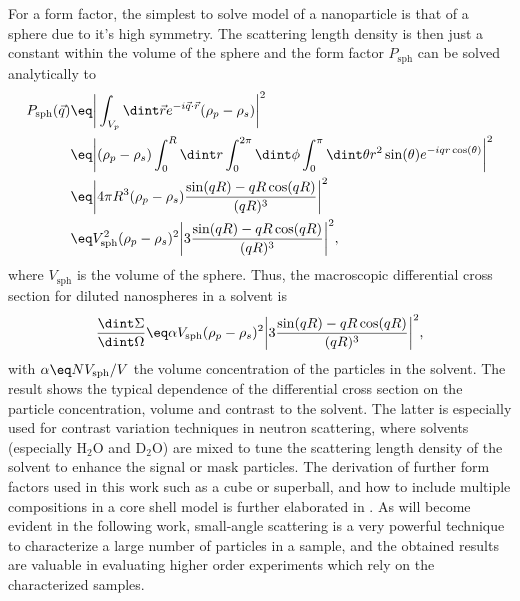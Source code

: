 \documentclass[\main/dresen_thesis.tex]{subfiles}
\begin{document}
    For a form factor, the simplest to solve model of a nanoparticle is that of a sphere due to it's high symmetry.
    The scattering length density is then just a constant within the volume of the sphere and the form factor $P_\mathrm{sph}$ can be solved analytically to
    \begin{align}
      \begin{split}
        P_\mathrm{sph} (\vec{q})
        \eq & \bigg|\int_{V_{p}} \dint \vec{r} e^{-i\vec{q} \cdot \vec{r}} (\rho_p - \rho_s) \bigg|^2 \\
        \eq & \bigg|(\rho_p - \rho_s) \int_0^R \dint r \int_0^{2 \pi} \dint \phi \int_0^\pi \dint \theta r^2 \sin(\theta) e^{-i q r \cos(\theta)}  \bigg|^2 \\
        \eq &  \bigg| 4\pi R^3 (\rho_p - \rho_s) \frac{\sin(qR) - qR\cos(qR)}{(qR)^3}  \bigg|^2\\
        \eq & V_\mathrm{sph}^2 (\rho_p - \rho_s)^2 \bigg|3 \frac{\sin(qR) - qR\cos(qR)}{(qR)^3}  \bigg|^2,
      \end{split}
    \end{align}
    where $V_\mathrm{sph}$ is the volume of the sphere.
    Thus, the macroscopic differential cross section for diluted nanospheres in a solvent is
    \begin{align}
      \frac{\dint \Sigma}{\dint \Omega}
      \eq \alpha V_\mathrm{sph} (\rho_p - \rho_s)^2 \bigg|3 \frac{\sin(qR) - qR\cos(qR)}{(qR)^3}  \bigg|^2,
    \end{align}
    with $\alpha \eq NV_\mathrm{sph} / V$ the volume concentration of the particles in the solvent.
    The result shows the typical dependence of the differential cross section on the particle concentration, volume and contrast to the solvent.
    The latter is especially used for contrast variation techniques in neutron scattering, where solvents (especially $\mathrm{H_2O}$ and $\mathrm{D_2O}$) are mixed to tune the scattering length density of the solvent to enhance the signal or mask particles.
    The derivation of further form factors used in this work such as a cube or superball, and how to include multiple compositions in a core shell model is further elaborated in .
    As will become evident in the following work, small-angle scattering is a very powerful technique to characterize a large number of particles in a sample, and the obtained results are valuable in evaluating higher order experiments which rely on the characterized samples.
\end{document}
